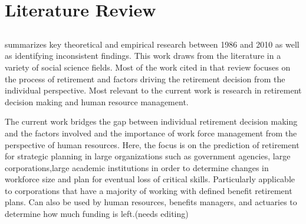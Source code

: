 \documentclass[12pt,letterpaper]{article}
\begin{document}


\section{Literature Review}

\subsection{}
\citet{Wang2010} summarizes key theoretical and empirical research between 1986 and 2010 as well as identifying inconsistent findings.  This work draws from the literature in a variety of social science fields. Most of the work cited in that review focuses on the process of retirement and factors driving the retirement decision from the individual perspective.  Most relevant to the current work is research in retirement decision making and human resource management.

The current work bridges the gap between individual retirement decision making and the factors involved and the importance of work force management from the perspective of human resources.  Here, the focus is on the prediction of retirement for strategic planning in large organizations such as government agencies, large corporations,large academic institutions in order to determine changes in workforce size and plan for eventual loss of critical skills.  Particularly applicable to corporations that have a majority of working with defined benefit retirement plans.   Can also be used by human resources, benefits managers, and actuaries to determine how much funding is left.(needs editing)
\end{document}
